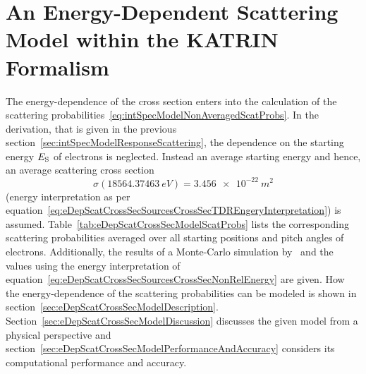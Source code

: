 \section{An Energy-Dependent Scattering Model within the KATRIN Formalism}
\label{sec:eDepScatCrossSecModel}
The energy-dependence of the cross section enters into the calculation of the scattering probabilities~\eqref{eq:intSpecModelNonAveragedScatProbs}. In the derivation, that is given in the previous section~\ref{sec:intSpecModelResponseScattering}, the dependence on the starting energy $E_\mathrm{S}$ of electrons is neglected. Instead an average starting energy and hence, an average scattering cross section
\begin{equation}
	\label{eq:eDepScatCrossSecModelTRDCrossSec}
	\sigma(\SI{18564.37463}{eV})=\SI{3.456e-22}{m^2}
\end{equation}  (energy interpretation as per equation~\ref{eq:eDepScatCrossSecSourcesCrossSecTDREngeryInterpretation}) is assumed. Table~\ref{tab:eDepScatCrossSecModelScatProbs} lists the corresponding scattering probabilities averaged over all starting positions and pitch angles of electrons. Additionally, the results of a Monte-Carlo simulation by~\cite{Groh2015} and the values using the energy interpretation of equation~\eqref{eq:eDepScatCrossSecSourcesCrossSecNonRelEnergy} are given. How the energy-dependence of the scattering probabilities can be modeled is shown in section~\ref{sec:eDepScatCrossSecModelDescription}. Section~\ref{sec:eDepScatCrossSecModelDiscussion} discusses the given model from a physical perspective and section~\ref{sec:eDepScatCrossSecModelPerformanceAndAccuracy} considers its computational performance and accuracy. 

